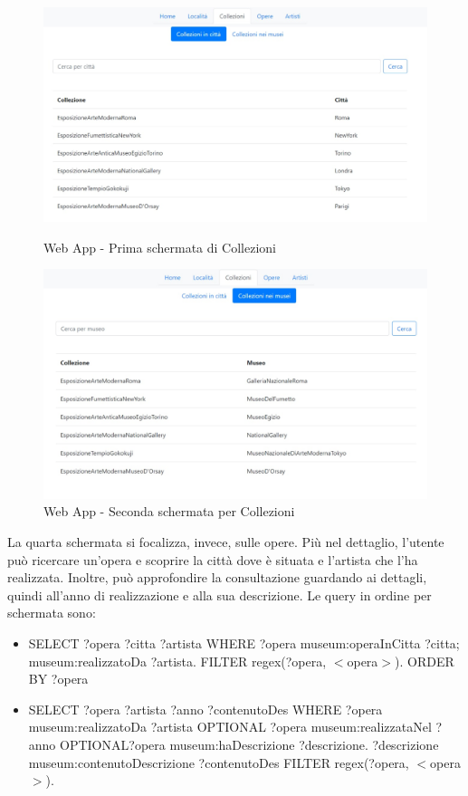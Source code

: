 \documentclass[12pt]{article}
\begin{document}
\begin{figure}[!h]
   \centering
   \includegraphics[scale=0.6]{fig/Schermata 3.1 webapp.jpg}
   \caption{Web App - Prima schermata di Collezioni}\label{fig:picture}
      \includegraphics[scale=0.6]{fig/Schermata 3.2 webapp.jpg}
   \caption{Web App - Seconda schermata per Collezioni}\label{fig:picture}
\end{figure}

\newpage
La quarta schermata si focalizza, invece, sulle opere. Più nel dettaglio, l’utente può ricercare un’opera e scoprire la città dove è situata e l’artista che l’ha realizzata. Inoltre, può approfondire la consultazione guardando ai dettagli, quindi all’anno di realizzazione e alla sua descrizione.
Le query in ordine per schermata sono:
\begin{itemize}
 \item SELECT ?opera ?citta ?artista WHERE { ?opera museum:operaInCitta ?citta; museum:realizzatoDa ?artista. FILTER regex(?opera, $<$opera$>$).} ORDER BY ?opera
 \item SELECT ?opera ?artista ?anno ?contenutoDes WHERE{ ?opera museum:realizzatoDa ?artista OPTIONAL {?opera museum:realizzataNel ?anno} OPTIONAL{?opera museum:haDescrizione ?descrizione. ?descrizione museum:contenutoDescrizione ?contenutoDes}  FILTER regex(?opera, $<$opera$>$).}
\end{itemize} 
\end{document}

